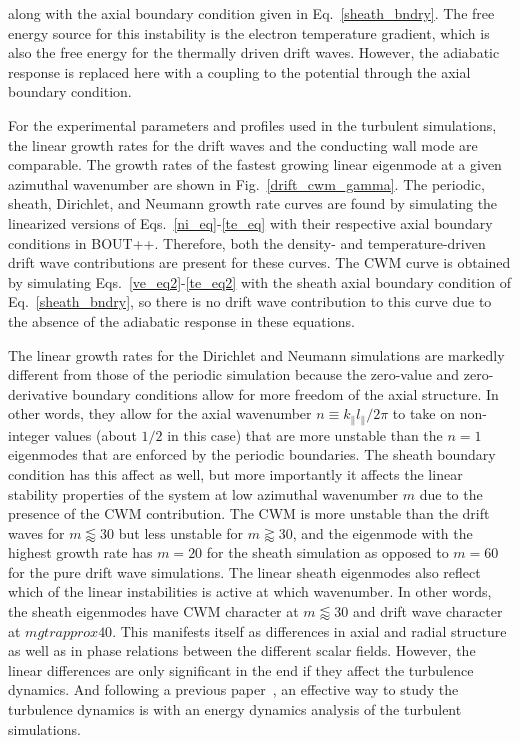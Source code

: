 \documentclass[showpacs,preprintnumbers,amsmath,amssymb,superscriptaddress,aip]{revtex4-1}
\def\para{\parallel}
\begin{document}
along with the axial boundary condition given in Eq.~\ref{sheath_bndry}. The free energy source for this instability is the electron temperature gradient, which is also the free energy
for the thermally driven drift waves. However, the adiabatic response is replaced here with a coupling to the potential through the axial boundary condition.

For the experimental parameters and profiles used in the turbulent simulations, 
the linear growth rates for the drift waves and the conducting wall mode are comparable. The growth rates of the fastest growing linear eigenmode at a given azimuthal wavenumber
are shown in Fig.~\ref{drift_cwm_gamma}.
The periodic, sheath, Dirichlet, and Neumann growth rate curves are found by simulating the linearized versions of Eqs.~\ref{ni_eq}-\ref{te_eq} with their respective
axial boundary conditions in BOUT++. Therefore, both the density- and temperature-driven drift wave contributions are present for these curves.
The CWM curve is obtained by simulating Eqs.~\ref{ve_eq2}-\ref{te_eq2} with the sheath axial boundary condition of Eq.~\ref{sheath_bndry}, so there is no drift wave contribution to this curve
due to the absence of the adiabatic response in these equations. 

The linear growth rates for the Dirichlet and Neumann simulations are markedly different from those of the periodic simulation because the zero-value and zero-derivative boundary conditions
allow for more freedom of the axial structure. In other words, they allow for the axial wavenumber $n \equiv k_\para l_\para / 2 \pi$ to take on non-integer values (about $1/2$ in this case) that
are more unstable than the $n=1$ eigenmodes that are enforced by the periodic boundaries. The sheath boundary condition has this affect as well, but more importantly
it affects the linear stability properties of the system at low azimuthal wavenumber $m$ due to the presence of the CWM contribution. The CWM is more unstable
than the drift waves for $m \lessapprox 30$ but less unstable for $m \gtrapprox 30$, and the eigenmode with the highest growth rate has $m=20$ for the sheath simulation as opposed to $m=60$ for the pure
drift wave simulations.
The linear sheath eigenmodes also reflect which of the linear instabilities is active at which wavenumber. In other words, the sheath eigenmodes have CWM character at $m \lessapprox 30$ and drift wave
character at $m gtrapprox 40$. This manifests itself as differences in axial and radial structure as well as in phase relations between the different scalar fields. However, the linear differences
are only significant in the end if they affect the turbulence dynamics. And following a previous paper~\cite{friedman2012b}, an effective way to study the turbulence dynamics is with
an energy dynamics analysis of the turbulent simulations.
\end{document}
